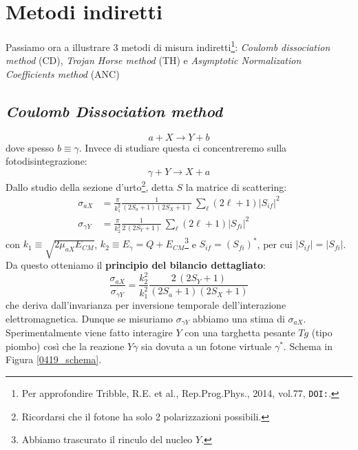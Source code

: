 \section{Metodi indiretti}
Passiamo ora a illustrare 3 metodi di misura indiretti\footnote{Per approfondire Tribble, R.E. et al., Rep.Prog.Phys., 2014, vol.77, \texttt{DOI:}.}: \textit{Coulomb dissociation method} (CD), \textit{Trojan Horse method} (TH) e \textit{Asymptotic Normalization Coefficients method} (ANC)

\subsection{\textit{Coulomb Dissociation method}}\label{sec-CD}
$$a+X \to Y+b$$
dove spesso $b\equiv \gamma$. Invece di studiare questa ci concentreremo sulla fotodisintegrazione:
$$\gamma + Y \to X+ a$$
Dallo studio della sezione d'urto\footnote{Ricordarsi che il fotone ha solo 2 polarizzazioni possibili.}, detta $S$ la matrice di scattering:
\begin{align*}
	\sigma_{aX} &= \frac{\pi}{k_1^2}\frac{1}{(2S_a+1)(2S_X+1)} \: \sum_\ell (2\ell+1) |S_{if}|^2 \\
	\sigma_{\gamma Y} &= \frac{\pi}{k_2^2}\frac{1}{2\,(2S_Y+1)} \: \sum_\ell (2\ell+1) |S_{fi}|^2 
\end{align*}
con $k_1\equiv\sqrt{2\mu_{aX}E_{CM}}$, $k_2\equiv E_\gamma = Q+E_{CM}$\footnote{Abbiamo trascurato il rinculo del nucleo $Y$.} e $S_{if} = (S_{fi})^*$, per cui $|S_{if}|= |S_{fi}|$. Da questo otteniamo il \textbf{principio del bilancio dettagliato}:
$$\frac{\sigma_{aX}}{\sigma_{\gamma Y}} = \frac{k_2^2}{k_1^2} \frac{2\,(2S_Y+1)}{(2S_a+1)(2S_X+1)}$$
che deriva dall'invarianza per inversione temporale dell'interazione elettromagnetica. Dunque se misuriamo $\sigma_{\gamma Y}$ abbiamo una stima di $\sigma_{aX}$. Sperimentalmente viene fatto interagire $Y$ con una targhetta pesante $Tg$ (tipo piombo) così che la reazione $Y\gamma$ sia dovuta a un fotone virtuale $\gamma^*$. Schema in Figura \ref{0419_schema}.

